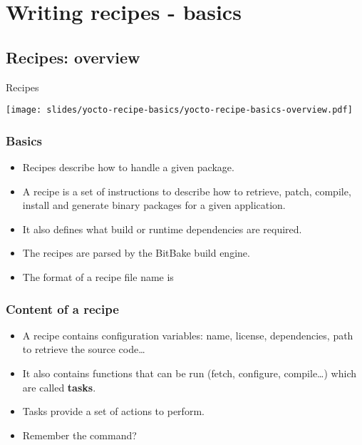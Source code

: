 \section{Writing recipes - basics}

\subsection{Recipes: overview}

\begin{frame}{Recipes}
  \begin{center}
    \texttt{[image: slides/yocto-recipe-basics/yocto-recipe-basics-overview.pdf]}
  \end{center}
\end{frame}

\begin{frame}
  \frametitle{Basics}
  \begin{itemize}
    \item Recipes describe how to handle a given package.
    \item A recipe is a set of instructions to describe how to
      retrieve, patch, compile, install and generate binary packages
      for a given application.
    \item It also defines what build or runtime dependencies are
      required.
    \item The recipes are parsed by the BitBake build engine.
    \item The format of a recipe file name is
  \end{itemize}
\end{frame}

\begin{frame}
  \frametitle{Content of a recipe}
  \begin{itemize}
    \item A recipe contains configuration variables: name, license,
      dependencies, path to retrieve the source code\dots
    \item It also contains functions that can be run (fetch,
      configure, compile\dots) which are called {\bf tasks}.
    \item Tasks provide a set of actions to perform.
    \item Remember the  command?
  \end{itemize}
\end{frame}

